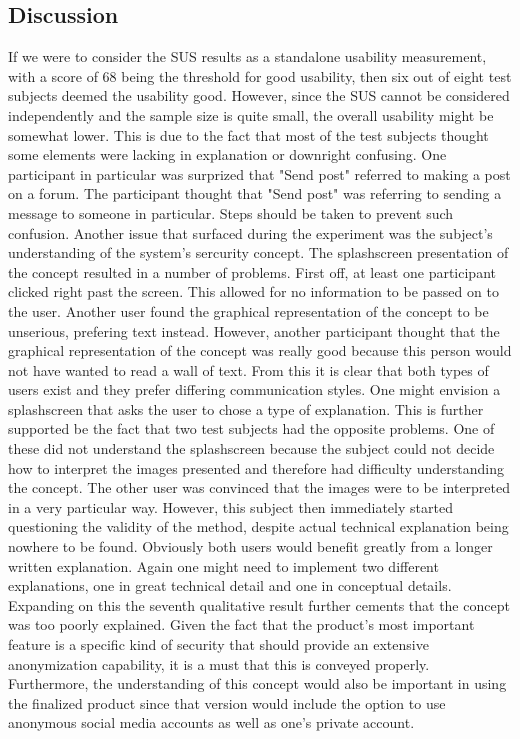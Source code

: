 \subsection{Discussion}
If we were to consider the SUS results as a standalone usability measurement, with a score of 68 being the threshold for good usability, then six out of eight test subjects deemed the usability good. However, since the SUS cannot be considered independently and the sample size is quite small, the overall usability might be somewhat lower. This is due to the fact that most of the test subjects thought some elements were lacking in explanation or downright confusing. One participant in particular was surprized that "Send post" referred to making a post on a forum. The participant thought that "Send post" was referring to sending a message to someone in particular. Steps should be taken to prevent such confusion. 
\newline
Another issue that surfaced during the experiment was the subject's understanding of the system's sercurity concept. The splashscreen presentation of the concept resulted in a number of problems. First off, at least one participant clicked right past the screen. This allowed for no information to be passed on to the user. Another user found the graphical representation of the concept to be unserious, prefering text instead. However, another participant thought that the graphical representation of the concept was really good because this person would not have wanted to read a wall of text. From this it is clear that both types of users exist and they prefer differing communication styles. One might envision a splashscreen that asks the user to chose a type of explanation. This is further supported be the fact that two test subjects had the opposite problems. One of these did not understand the splashscreen because the subject could not decide how to interpret the images presented and therefore had difficulty understanding the concept. The other user was convinced that the images were to be interpreted in a very particular way. However, this subject then immediately started questioning the validity of the method, despite actual technical explanation being nowhere to be found. Obviously both users would benefit greatly from a longer written explanation. Again one might need to implement two different explanations, one in great technical detail and one in conceptual details. 
Expanding on this the seventh qualitative result further cements that the concept was too poorly explained. Given the fact that the product's most important feature is a specific kind of security that should provide an extensive anonymization capability, it is a must that this is conveyed properly. Furthermore, the understanding of this concept would also be important in using the finalized product since that version would include the option to use anonymous social media accounts as well as one's private account. 
